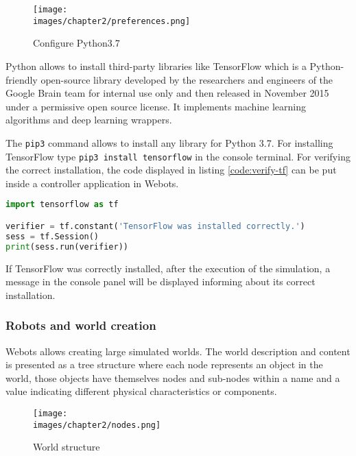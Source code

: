 \begin{figure}[ht]
	\texttt{[image: \\images/chapter2/preferences.png]}
	\caption{Configure Python3.7}
	\label{fig-ch-2:python}
\end{figure}

Python allows to install third-party libraries like TensorFlow which is a Python-friendly open-source library developed by the researchers and engineers of the Google Brain team for internal use only and  then released in November 2015 under a permissive open source license. It implements machine learning algorithms and deep learning wrappers\cite{Raschka:2015:PML:2886323}.

The \verb|pip3| command allows to install any library for Python 3.7. For installing TensorFlow type \verb|pip3 install tensorflow| in the console terminal. For verifying the correct installation, the code displayed in listing \ref{code:verify-tf} can be put inside a controller application in Webots.

\begin{lstlisting}[language=Python, caption=Verify correct installation of TensorFlow, label=code:verify-tf]
import tensorflow as tf

verifier = tf.constant('TensorFlow was installed correctly.')
sess = tf.Session()
print(sess.run(verifier))
\end{lstlisting}

If TensorFlow was correctly installed, after the execution of the simulation, a message in the console panel will be displayed informing about its correct installation.


\subsubsection{Robots and world creation}

Webots allows creating large simulated worlds. The world description and content is presented as a tree structure where each node represents an object in the world, those objects have themselves nodes and sub-nodes within a name and a value indicating different physical characteristics or components. 

\begin{figure}[h!]
  \centering
  \texttt{[image: \\images/chapter2/nodes.png]}
  \caption{World structure}
  \label{fig:ch-2:nodes}
\end{figure}

